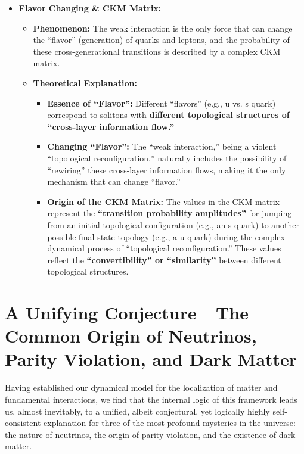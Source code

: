 \documentclass[11pt, a4paper]{article}
\begin{document}
\begin{itemize}
    \item \textbf{Flavor Changing \& CKM Matrix:}
    \begin{itemize}
        \item \textbf{Phenomenon:} The weak interaction is the only force that can change the ``flavor'' (generation) of quarks and leptons, and the probability of these cross-generational transitions is described by a complex CKM matrix.
        \item \textbf{Theoretical Explanation:}
        \begin{itemize}
            \item \textbf{Essence of ``Flavor'':} Different ``flavors'' (e.g., u vs. s quark) correspond to solitons with \textbf{different topological structures of ``cross-layer information flow.''}
            \item \textbf{Changing ``Flavor'':} The ``weak interaction,'' being a violent ``topological reconfiguration,'' naturally includes the possibility of ``rewiring'' these cross-layer information flows, making it the only mechanism that can change ``flavor.''
            \item \textbf{Origin of the CKM Matrix:} The values in the CKM matrix represent the \textbf{``transition probability amplitudes''} for jumping from an initial topological configuration (e.g., an s quark) to another possible final state topology (e.g., a u quark) during the complex dynamical process of ``topological reconfiguration.'' These values reflect the \textbf{``convertibility'' or ``similarity''} between different topological structures.
        \end{itemize}
    \end{itemize}
\end{itemize}

\section{A Unifying Conjecture---The Common Origin of Neutrinos, Parity Violation, and Dark Matter}

Having established our dynamical model for the localization of matter and fundamental interactions, we find that the internal logic of this framework leads us, almost inevitably, to a unified, albeit conjectural, yet logically highly self-consistent explanation for three of the most profound mysteries in the universe: the nature of neutrinos, the origin of parity violation, and the existence of dark matter.
\end{document}
